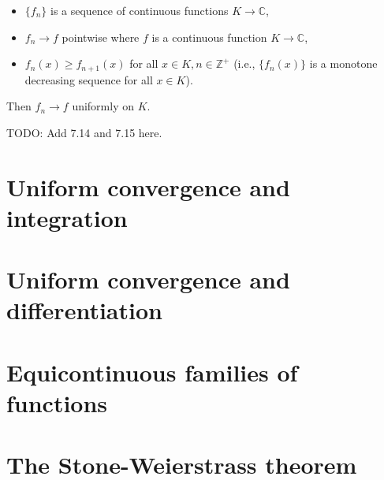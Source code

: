 \documentclass[a4paper]{article}
\newcommand{\C}{\mathbb{C}}
\newcommand{\Z}{\mathbb{Z}}
\begin{document}
\begin{itemize}
    \item $\{f_n\}$ is a sequence of continuous functions $K \to \C$,
    \item $f_n \to f$ pointwise where $f$ is a continuous function $K \to \C$,
    \item $f_n(x) \geq f_{n+1}(x)$ for all $x \in K, n \in \Z^+$ (i.e., $\{f_n(x)\}$ is a monotone decreasing sequence for all $x \in K$).
\end{itemize}

Then $f_n \to f$ uniformly on $K$.

TODO: Add 7.14 and 7.15 here.

\section{Uniform convergence and integration}

\section{Uniform convergence and differentiation}

\section{Equicontinuous families of functions}

\section{The Stone-Weierstrass theorem}
\end{document}

